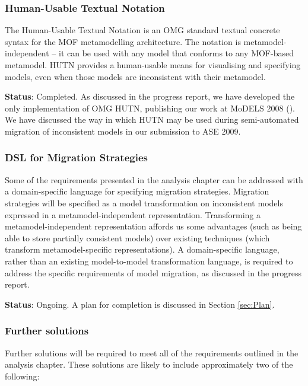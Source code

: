 \subsubsection{Human-Usable Textual Notation}
The Human-Usable Textual Notation is an OMG standard textual concrete syntax for the MOF metamodelling architecture. The notation is metamodel-independent -- it can be used with any model that conforms to any MOF-based metamodel. HUTN provides a human-usable means for visualising and specifying models, even when those models are inconsistent with their metamodel.

\textbf{Status}: Completed. As discussed in the progress report, we have developed the only implementation of OMG HUTN, publishing our work at MoDELS 2008 (\cite{rose08hutn}). We have discussed the way in which HUTN may be used during semi-automated migration of inconsistent models in our submission to ASE 2009.


\subsubsection{DSL for Migration Strategies}
Some of the requirements presented in the analysis chapter can be addressed with a domain-specific language for specifying migration strategies. Migration strategies will be specified as a model transformation on inconsistent models expressed in a metamodel-independent representation. Transforming a metamodel-independent representation affords us some advantages (such as being able to store partially consistent models) over existing techniques (which transform metamodel-specific representations). A domain-specific language, rather than an existing model-to-model transformation language, is required to address the specific requirements of model migration, as discussed in the progress report.

\textbf{Status}: Ongoing. A plan for completion is discussed in Section \ref{sec:Plan}.


\subsubsection{Further solutions}
\label{subsubsec:further_solutions}
Further solutions will be required to meet all of the requirements outlined in the analysis chapter. These solutions are likely to include approximately two of the following:

